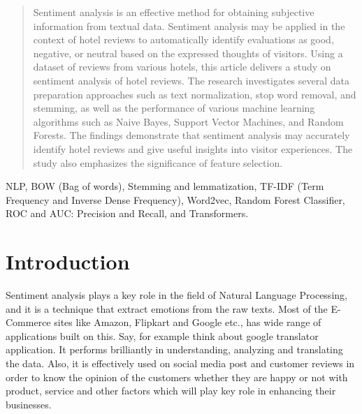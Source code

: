 

\maketitle

\begin{abstract}
 
  
Sentiment analysis is an effective method for obtaining subjective information from textual data. Sentiment analysis may be applied in the context of hotel reviews to automatically identify evaluations as good, negative, or neutral based on the expressed thoughts of visitors. Using a dataset of reviews from various hotels, this article delivers a study on sentiment analysis of hotel reviews. The research investigates several data preparation approaches such as text normalization, stop word removal, and stemming, as well as the performance of various machine learning algorithms such as Naive Bayes, Support Vector Machines, and Random Forests. The findings demonstrate that sentiment analysis may accurately identify hotel reviews and give useful insights into visitor experiences. The study also emphasizes the significance of feature selection.

  
\end{abstract}

\begin{IEEEkeywords}
 NLP, BOW (Bag of words), Stemming and lemmatization, TF-IDF (Term Frequency and Inverse Dense Frequency), Word2vec, Random Forest Classifier, ROC and AUC: Precision and Recall, and Transformers.
  \end{IEEEkeywords}



\section{Introduction}
Sentiment analysis plays a key role in the field of Natural Language Processing, and it is a technique that extract emotions from the raw texts. Most of the E-Commerce sites like Amazon, Flipkart and Google etc., has wide range of applications built on this. Say, for example think about google translator application. It performs brilliantly in understanding, analyzing and translating the data. Also, it is effectively used on social media post and customer reviews in order to know the opinion of the customers whether they are happy or not with product, service and other factors which will play key role in enhancing their businesses. 
